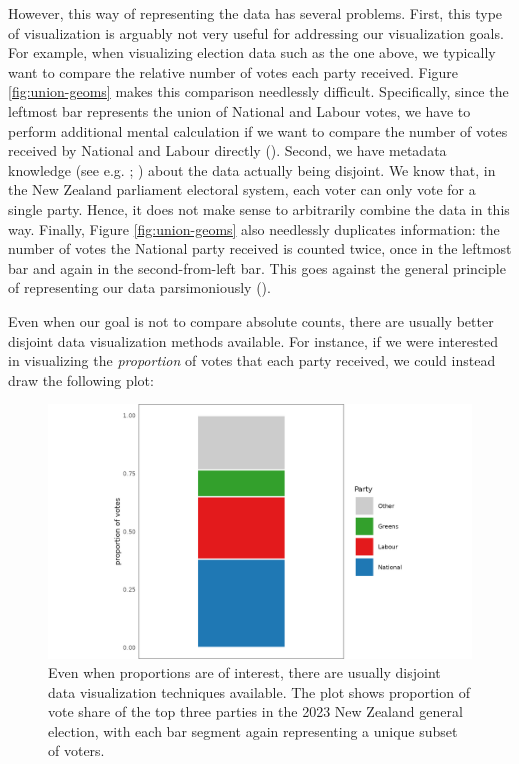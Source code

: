 \documentclass[
]{book}
\theoremstyle{definition}
\theoremstyle{definition}
\theoremstyle{definition}
\theoremstyle{definition}
\theoremstyle{remark}
\begin{document}
However, this way of representing the data has several problems. First, this type of visualization is arguably not very useful for addressing our visualization goals. For example, when visualizing election data such as the one above, we typically want to compare the relative number of votes each party received. Figure \ref{fig:union-geoms} makes this comparison needlessly difficult. Specifically, since the leftmost bar represents the union of National and Labour votes, we have to perform additional mental calculation if we want to compare the number of votes received by National and Labour directly (). Second, we have metadata knowledge (see e.g. ; ) about the data actually being disjoint. We know that, in the New Zealand parliament electoral system, each voter can only vote for a single party. Hence, it does not make sense to arbitrarily combine the data in this way. Finally, Figure \ref{fig:union-geoms} also needlessly duplicates information: the number of votes the National party received is counted twice, once in the leftmost bar and again in the second-from-left bar. This goes against the general principle of representing our data parsimoniously ().

Even when our goal is not to compare absolute counts, there are usually better disjoint data visualization methods available. For instance, if we were interested in visualizing the \emph{proportion} of votes that each party received, we could instead draw the following plot:

\begin{figure}

{\centering \includegraphics[width=1\linewidth,height=1\textheight]{./figures/barplot-bijection-proportions} 

}

\caption{Even when proportions are of interest, there are usually disjoint data visualization techniques available. The plot shows proportion of vote share of the top three parties in the 2023 New Zealand general election, with each bar segment again representing a unique subset of voters.}\label{fig:stacked-proportion}
\end{figure}
\end{document}
